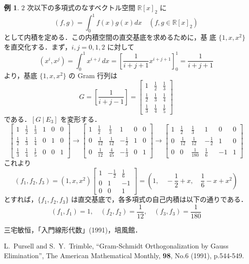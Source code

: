 \documentclass[11pt, uplatex, dvipdfmx]{jsarticle}
\theoremstyle{definition}
\newtheorem{example}{例}
\renewcommand{\arraystretch}{1.2}
\begin{document}
\begin{example}\renewcommand{\arraystretch}{1.2}
  
  $2$ 次以下の多項式のなすベクトル空間 $\mathbb{R}[x]_2$ に
  \[
    (f,g) = \int_{0}^{1} f(x) g(x) dx \quad \left( f, g \in \mathbb{R}[x]_2\right)
  \]
  として内積を定める．この内積空間の直交基底を求めるために，基
  底 $\{1, x, x^2\}$ を直交化する．まず，$i,j=0,1,2$ に対して
  \[
    (x^i, x^j) = \int_{0}^{1} x^{i+j} \ dx = \left[
      \frac{1}{i+j+1}x^{i+j+1} \right]_{0}^{1}= \frac{1}{i+j+1}
  \]
  より，基底 $\{1, x, x^2\}$ の Gram 行列は
    \[
      G= \left[ \frac{1}{i+j-1} \right] =\left[
        \begin{array}{ccc}
          1 & \frac{1}{2} & \frac{1}{3}\\
          \frac{1}{2} & \frac{1}{3} & \frac{1}{4}\\
          \frac{1}{3} & \frac{1}{4} & \frac{1}{5}
        \end{array}
      \right]
    \]
  である．$\left[ G \ | \ E_3\right]$ を変形する．
    \[
      \left[
        \begin{array}{ccc|ccc}
          1 & \frac{1}{2} & \frac{1}{3}& 1 & 0 & 0\\
          \frac{1}{2} & \frac{1}{3} & \frac{1}{4} & 0 & 1 & 0\\
          \frac{1}{3} & \frac{1}{4} & \frac{1}{5} & 0 & 0 & 1
        \end{array}
      \right] \to \left[
        \begin{array}{ccc|rcc}
          1 & \frac{1}{2} & \frac{1}{3} & 1 & 0 & 0\\
          0 & \frac{1}{12} & \frac{1}{12} & -\frac{1}{2} & 1 & 0\\
          0 & \frac{1}{12} & \frac{4}{45} & -\frac{1}{3} & 0 & 1
        \end{array}
      \right] \to \left[
        \begin{array}{ccc|rrc}
          1 & \frac{1}{2} & \frac{1}{3} & 1 & 0 & 0\\
          0 & \frac{1}{12} & \frac{1}{12} & -\frac{1}{2} & 1 & 0\\
          0 & 0 & \frac{1}{180} & \frac{1}{6} & -1 & 1
        \end{array}
      \right]
    \]
  これより
  \[
    (f_1, f_2, f_3) = \left( 1, x, x^2\right) \left[
      \begin{array}{rrr}
        1 & -\frac{1}{2} & \frac{1}{6}\\
        0 & 1 & -1\\
        0 & 0 & 1
      \end{array}
    \right] = \left( 1, \quad -\frac{1}{2} + x, \quad \frac{1}{6} -x+x^2\right)
  \]
  とすれば，$\{f_1, f_2, f_3\}$ は直交基底で，各多項式の自己内積は以下の通りである．
  \[
    (f_1, f_1) = 1, \quad (f_2, f_2) = \frac{1}{12}, \quad (f_3,f_3) = \frac{1}{180}
  \]


 \renewcommand{\arraystretch}{1}
\end{example}



\begin{thebibliography}{9}

 三宅敏恒，「入門線形代数」(1991)，培風館．
  
 L.~Pursell and S.~Y.~Trimble, ``Gram-Schmidt
  Orthogonalization by Gauss Elimination'', The American Mathematical
  Monthly, \textbf{98}, No.6 (1991), p.544-549.
\end{thebibliography}
\end{document}
